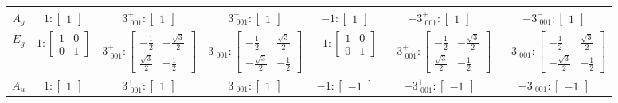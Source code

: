 \documentclass[fleqn,8pt,landscape]{jsarticle}
\begin{document}
\begin{longtable}{ccccccc}
$ A_{g} $ & $ 1:\begin{bmatrix} 1 \end{bmatrix} $ & $ 3^{+}_{\,\,001}:\begin{bmatrix} 1 \end{bmatrix} $ & $ 3^{-}_{\,\,001}:\begin{bmatrix} 1 \end{bmatrix} $ & $ -1:\begin{bmatrix} 1 \end{bmatrix} $ & $ -3^{+}_{\,\,001}:\begin{bmatrix} 1 \end{bmatrix} $ & $ -3^{-}_{\,\,001}:\begin{bmatrix} 1 \end{bmatrix} $ \\ \hline
$ E_{g} $ & $ 1:\begin{bmatrix} 1 & 0 \\ 0 & 1 \end{bmatrix} $ & $ 3^{+}_{\,\,001}:\begin{bmatrix} - \frac{1}{2} & - \frac{\sqrt{3}}{2} \\ \frac{\sqrt{3}}{2} & - \frac{1}{2} \end{bmatrix} $ & $ 3^{-}_{\,\,001}:\begin{bmatrix} - \frac{1}{2} & \frac{\sqrt{3}}{2} \\ - \frac{\sqrt{3}}{2} & - \frac{1}{2} \end{bmatrix} $ & $ -1:\begin{bmatrix} 1 & 0 \\ 0 & 1 \end{bmatrix} $ & $ -3^{+}_{\,\,001}:\begin{bmatrix} - \frac{1}{2} & - \frac{\sqrt{3}}{2} \\ \frac{\sqrt{3}}{2} & - \frac{1}{2} \end{bmatrix} $ & $ -3^{-}_{\,\,001}:\begin{bmatrix} - \frac{1}{2} & \frac{\sqrt{3}}{2} \\ - \frac{\sqrt{3}}{2} & - \frac{1}{2} \end{bmatrix} $ \\ \hline
$ A_{u} $ & $ 1:\begin{bmatrix} 1 \end{bmatrix} $ & $ 3^{+}_{\,\,001}:\begin{bmatrix} 1 \end{bmatrix} $ & $ 3^{-}_{\,\,001}:\begin{bmatrix} 1 \end{bmatrix} $ & $ -1:\begin{bmatrix} -1 \end{bmatrix} $ & $ -3^{+}_{\,\,001}:\begin{bmatrix} -1 \end{bmatrix} $ & $ -3^{-}_{\,\,001}:\begin{bmatrix} -1 \end{bmatrix} $ \\ \hline

\end{longtable}
\end{document}
